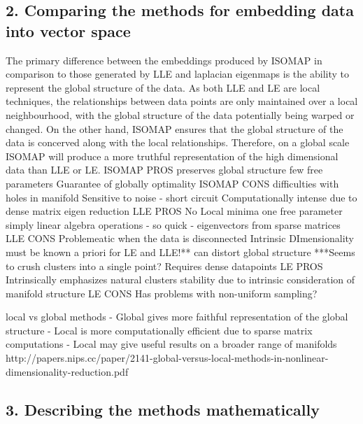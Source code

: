 \documentclass{article}
\begin{document}
\subsection{2. Comparing the methods for embedding data into vector space}
The primary difference between the embeddings produced by ISOMAP in comparison to those generated by LLE and laplacian eigenmaps is the ability to represent the global structure of the data. As both LLE and LE are local techniques, the relationships between data points are only maintained over a local neighbourhood, with the global structure of the data potentially being warped or changed. On the other hand, ISOMAP ensures that the global structure of the data is concerved along with the local relationships. Therefore, on a global scale ISOMAP will produce a more truthful representation of the high dimensional data than LLE or LE. 
ISOMAP PROS
preserves global structure
few free parameters
Guarantee of globally optimality
ISOMAP CONS
difficulties with holes in manifold
Sensitive to noise - short circuit 
Computationally intense due to dense matrix eigen reduction 
LLE PROS
No Local minima
one free parameter
simply linear algebra operations - so quick - eigenvectors from sparse matrices 
LLE CONS
Problemeatic when the data is disconnected
Intrinsic DImensionality must be known a priori for LE and LLE!**
can distort global structure 
***Seems to crush clusters into a single point?
Requires dense datapoints
LE PROS
Intrinsically emphasizes natural clusters 
stability due to intrinsic consideration of manifold structure
LE CONS
Has problems with non-uniform sampling?

local vs global methods
- Global gives more faithful representation of the global structure
- Local is more computationally efficient due to sparse matrix computations 
- Local may give useful results on a broader range of manifolds
http://papers.nips.cc/paper/2141-global-versus-local-methods-in-nonlinear-dimensionality-reduction.pdf
\subsection{3. Describing the methods mathematically}
\end{document}
